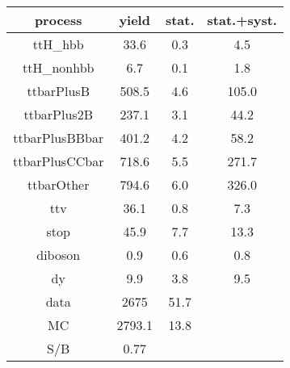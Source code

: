 \begin{tabular}{cccc}
\hline
    process     &  yield  &  stat.  &  stat.+syst.  \\
\hline
    ttH\_hbb     &  33.6   &   0.3   &      4.5      \\
   ttH\_nonhbb   &   6.7   &   0.1   &      1.8      \\
   ttbarPlusB   &  508.5  &   4.6   &     105.0     \\
  ttbarPlus2B   &  237.1  &   3.1   &     44.2      \\
 ttbarPlusBBbar &  401.2  &   4.2   &     58.2      \\
 ttbarPlusCCbar &  718.6  &   5.5   &     271.7     \\
   ttbarOther   &  794.6  &   6.0   &     326.0     \\
      ttv       &  36.1   &   0.8   &      7.3      \\
      stop      &  45.9   &   7.7   &     13.3      \\
    diboson     &   0.9   &   0.6   &      0.8      \\
       dy       &   9.9   &   3.8   &      9.5      \\
\hline
      data      &  2675   &  51.7   &               \\
       MC       & 2793.1  &  13.8   &               \\
\hline
      S/B       &  0.77   &         &               \\
\hline
\end{tabular}
